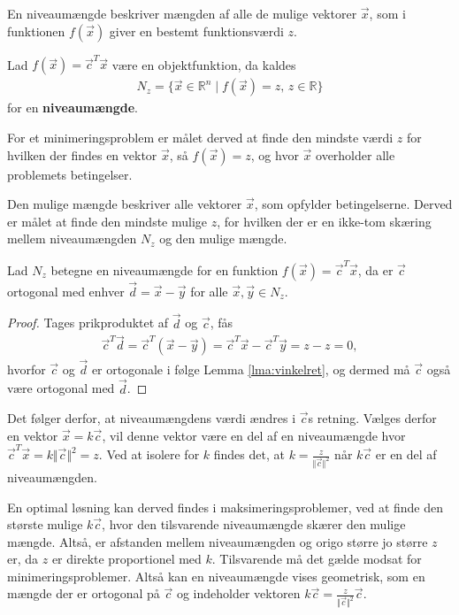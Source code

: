 
En niveaumængde beskriver mængden af alle de mulige vektorer $\vec{x}$, som i funktionen $f(\vec{x})$ giver en bestemt funktionsværdi $z$. 
\begin{defn}[Niveaumængde]
Lad $f(\vec{x})= \vec{c}^T\vec{x}$ være en objektfunktion, da kaldes
\begin{align*}
N_z = \{\vec{x} \in \mathds{R}^n \mid f(\vec{x}) = z, \, z \in \mathds{R}\}
\end{align*}
for en \textbf{niveaumængde}.
\end{defn}



For et minimeringsproblem er målet derved at finde den mindste værdi $z$ for hvilken der findes en vektor $\vec{x}$, så $f(\vec{x})=z$, og hvor $\vec{x}$ overholder alle problemets betingelser.

Den mulige mængde beskriver alle vektorer $\vec{x}$, som opfylder betingelserne. Derved er målet at finde den mindste mulige $z$, for hvilken der er en ikke-tom skæring mellem niveaumængden $N_z$ og den mulige mængde.

\begin{stn}
Lad $N_z$ betegne en niveaumængde for en funktion $f(\vec{x})=\vec{c}^T\vec{x}$, da er $\vec{c}$ ortogonal med enhver $\vec{d}= \vec{x}-\vec{y}$ for alle $\vec{x}, \vec{y} \in N_z$. 
\end{stn}

\begin{proof}
Tages prikproduktet af $\vec{d}$ og $\vec{c}$, fås
\begin{align*}
\vec{c}^T\vec{d}=\vec{c}^T(\vec{x}-\vec{y}) = \vec{c}^T\vec{x} -\vec{c}^T\vec{y} = z - z = 0,
\end{align*}
hvorfor $\vec{c}$ og $\vec{d}$ er ortogonale i følge Lemma \ref{lma:vinkelret}, og dermed må $\vec{c}$ også være ortogonal med $\vec{d}$.
\end{proof}
Det følger derfor, at niveaumængdens værdi ændres i $\vec{c}$s retning. 
Vælges derfor en vektor $\vec{x}=k\vec{c}$, vil denne vektor være en del af en niveaumængde hvor $\vec{c}^T\vec{x}=k\Vert\vec{c}\Vert^2=z$. Ved at isolere for $k$ findes det, at $k=\frac{z}{\Vert\vec{c}\Vert^2}$ når $k\vec{c}$ er en del af niveaumængden.


En optimal løsning kan derved findes i maksimeringsproblemer, ved at finde den største mulige $k\vec{c}$, hvor den tilsvarende niveaumængde skærer den mulige mængde. Altså, er afstanden mellem niveaumængden og origo større jo større $z$ er, da $z$ er direkte proportionel med $k$. Tilsvarende må det gælde modsat for minimeringsproblemer. 
Altså kan en niveaumængde vises geometrisk, som en mængde der er ortogonal på $\vec{c}$ og indeholder vektoren $k\vec{c}=\frac{z}{\Vert\vec{c}\Vert^2}\vec{c}$.

